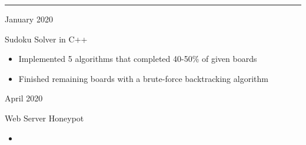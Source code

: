 \documentclass[a4paper]{article}
\newlength{\cvcolumngapwidth}
\newlength{\cvleftcolumnwidth}
\newlength{\cvrightcolumnwidth}
\newcommand{\cvsectionstyle}[1]{{\normalsize\cvsectionfont\textcolor{cvsectioncolor}{#1}}}
\newcommand{\cvtitlestyle}[1]{{\large\cvtitlefont\textcolor{cvtitlecolor}{#1}}}
\newcommand{\cvdurationstyle}[1]{{\small\cvdurationfont\textcolor{cvdurationcolor}{#1}}}
\newlength{\cvafteritemskipamount}
\newlength{\cvaftersectionskipamount}
\newlength{\cvaftertitleskipamount}
\newlength{\cvparskip}
\newcommand{\cvsection}[1]{
    \begin{minipage}[t]{\cvleftcolumnwidth}
        \raggedleft\cvsectionstyle{#1}
    \end{minipage}%
    \hspace{\cvcolumngapwidth}%
    \begin{minipage}[t]{\cvrightcolumnwidth}
        \textcolor{cvrulecolor}{\rule{\cvrightcolumnwidth}{0.3mm}}
    \end{minipage}

    \vspace{\cvaftersectionskipamount}
}
\newcommand{\cvitem}[2]{
    \begin{minipage}[t]{\cvleftcolumnwidth}
        \raggedleft #1
    \end{minipage}%
    \hspace{\cvcolumngapwidth}%
    \begin{minipage}[t]{\cvrightcolumnwidth}
        \setlength{\parskip}{\cvparskip} #2
    \end{minipage}

    \vspace{\cvafteritemskipamount}
}
\newcommand{\cvtitle}[1]{
    \cvtitlestyle{#1}

    \vspace{\cvaftertitleskipamount}
    \vspace{-\cvparskip}
}
\begin{document}

\cvsection{EXTRACURRICULARS}

\cvitem{
    \cvdurationstyle{January 2020}
}{
    \cvtitle{Sudoku Solver in C++}

    \begin{itemize}[leftmargin=*]
        \item Implemented 5 algorithms that completed 40-50\% of given boards
        \item Finished remaining boards with a brute-force backtracking algorithm
        
    \end{itemize}
}
\cvitem{
    \cvdurationstyle{April 2020}
}{
    \cvtitle{Web Server Honeypot}

    \begin{itemize}[leftmargin=*]
        \item 
        
    \end{itemize}
}
\end{document}
